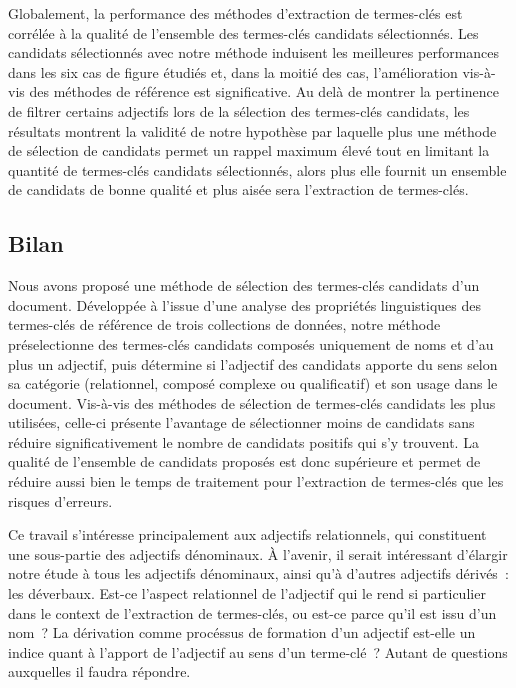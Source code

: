         Globalement, la performance des méthodes d'extraction de termes-clés est
        corrélée à la qualité de l'ensemble des termes-clés candidats
        sélectionnés. Les candidats sélectionnés avec notre méthode induisent
        les meilleures performances dans les six cas de figure étudiés et, dans
        la moitié des cas, l'amélioration vis-à-vis des méthodes de référence
        est significative. Au delà de montrer la pertinence de filtrer certains
        adjectifs lors de la sélection des termes-clés candidats, les résultats
        montrent la validité de notre hypothèse par laquelle plus une méthode de
        sélection de candidats permet un rappel maximum élevé tout en limitant
        la quantité de termes-clés candidats sélectionnés, alors plus
        elle fournit un ensemble de candidats de bonne qualité et plus aisée
        sera l'extraction de termes-clés.

    \subsection{Bilan}
    \label{subsec:main:domain_independent_keyphrase_extraction-keyphrase_candidate_selection-conclusion}
      Nous avons proposé une méthode de sélection des termes-clés candidats d'un
      document. Développée à l'issue d'une analyse des propriétés linguistiques
      des termes-clés de référence de trois collections de données, notre
      méthode préselectionne des termes-clés candidats composés uniquement de
      noms et d'au plus un adjectif, puis détermine si l'adjectif des candidats
      apporte du sens selon sa catégorie (relationnel, composé complexe ou
      qualificatif) et son usage dans le document. Vis-à-vis des méthodes de
      sélection de termes-clés candidats les plus utilisées, celle-ci présente
      l'avantage de sélectionner moins de candidats sans réduire
      significativement le nombre de candidats positifs qui s'y trouvent. La
      qualité de l'ensemble de candidats proposés est donc supérieure et permet
      de réduire aussi bien le temps de traitement pour l'extraction de
      termes-clés que les risques d'erreurs.

      Ce travail s'intéresse principalement aux adjectifs relationnels, qui
      constituent une sous-partie des adjectifs dénominaux. À l'avenir, il
      serait intéressant d'élargir notre étude à tous les adjectifs dénominaux,
      ainsi qu'à d'autres adjectifs dérivés~: les déverbaux. Est-ce l'aspect
      relationnel de l'adjectif qui le rend si particulier dans le context de
      l'extraction de termes-clés, ou est-ce parce qu'il est issu d'un nom~? La
      dérivation comme procéssus de formation d'un adjectif est-elle un indice
      quant à l'apport de l'adjectif au sens d'un terme-clé~? Autant de
      questions auxquelles il faudra répondre.

